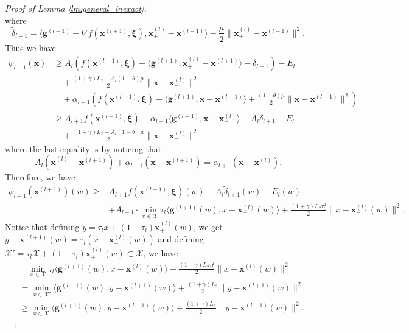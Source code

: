 \documentclass[11pt,fullpage,letterpaper]{article}
\newcommand{\mc}{\mathcal}
\newcommand{\mb}{\mathbf}
\newcommand{\bx}{\boldsymbol{\xi}}
\begin{document}
\begin{proof}[Proof of Lemma \ref{lm:general_inexact}]
\begin{displaymath}
\end{displaymath}
where
\begin{displaymath}
    \tilde{\delta}_{l+1} = \langle \mb g^{(l+1)} - \nabla f(\mb x^{(l+1)},\bx) ,\mb x_+^{(l)}-\mb x^{(l+1)}\rangle-\frac{\mu}{2}\|\mb x_+^{(l)} - \mb x^{(l+1)}\|^2.
\end{displaymath}
Thus we have
\begin{align*}
    \psi_{l+1}(\mb x) &\geq  A_l(f(\mb x^{(l+1)},\bx) + \langle \mb g^{(l+1)},\mb x_+^{(l)}-\mb x^{(l+1)}\rangle - \tilde{\delta}_{l+1}) - E_l \\
    &\quad + \frac{(1+\gamma)L_2+A_l(1-\theta)\mu}{2}\|\mb x-\mb x_-^{(l)}\|^2\\
    &\quad +\alpha_{l+1}(f(\mb x^{(l+1)},\bx) +\langle \mb g^{(l+1)},\mb x-\mb x^{(l+1)}\rangle + \frac{(1-\theta)\mu}{2}\|\mb x - \mb x^{(l+1)}\|^2)\\
    &  \geq A_{l+1}f(\mb x^{(l+1)},\bx) + \alpha_{l+1}\langle \mb g^{(l+1)},\mb x-\mb x_-^{(l)}\rangle  - A_l\tilde{\delta}_{l+1} - E_l \\
    &\quad + \frac{(1+\gamma)L_2+A_l(1-\theta)\mu}{2}\|\mb x-\mb x_-^{(l)}\|^2
\end{align*}
where the last equality is by noticing that
\begin{displaymath}
    A_l(\mb x_+^{(l)}-\mb x^{(l+1)}) + \alpha_{l+1}(\mb x-\mb x^{(l+1)}) = \alpha_{l+1}(\mb x-\mb x_-^{(l)}).
\end{displaymath}
Therefore, we have
\begin{align*}
    \psi_{l+1}(\mb x_-^{(l+1)})(w) \geq  & A_{l+1}f(\mb x^{(l+1)},\bx) (w)  - A_l\tilde{\delta}_{l+1}(w) - E_l(w) \\
    &+ A_{l+1}\cdot \min_{x\in \mc X}  \tau_{l}\langle \mb g^{(l+1)}(w),x-\mb x_-^{(l)}(w)\rangle+ \frac{(1+\gamma)L_2\tau_l^2}{2}\|x-\mb x_-^{(l)}(w)\|^2.
\end{align*}
Notice that defining $y = \tau_l x + (1-\tau_l)\mb x_+^{(l)}(w)$, we get $y-\mb x^{(l+1)}(w) = \tau_l(x-\mb x_-^{(l)}(w))$ and defining $\mc X' = \tau_l \mc X+ (1-\tau_l)\mb x_+^{(l)}(w) \subset \mc X$, we have
\begin{align*}
      &\quad \min_{x\in \mc X}  \tau_{l}\langle \mb g^{(l+1)}(w),x-\mb x_-^{(l)}(w)\rangle+ \frac{(1+\gamma)L_2\tau_l^2}{2}\|x-\mb x_-^{(l)}(w)\|^2 \\
    & = \min_{x\in \mc X'}  \langle \mb g^{(l+1)}(w),y-\mb x^{(l+1)}(w)\rangle+ \frac{(1+\gamma)L_2}{2}\|y-\mb x^{(l+1)}(w)\|^2\\
    &\geq \min_{x\in \mc X}   \langle \mb g^{(l+1)}(w),y-\mb x^{(l+1)}(w)\rangle+ \frac{(1+\gamma)L_2}{2}\|y-\mb x^{(l+1)}(w)\|^2.

\end{align*}
\end{proof}
\end{document}
